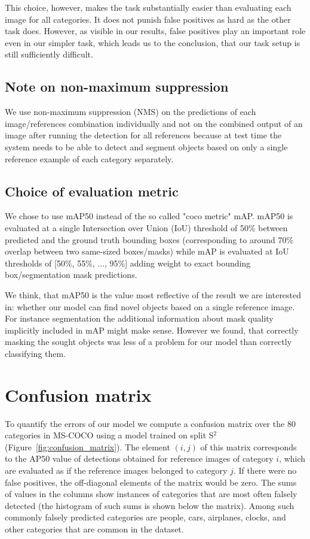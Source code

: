 \documentclass{article}
\newcommand{\coco}{MS-COCO\xspace}
\begin{document}
This choice, however, makes the task substantially easier than evaluating each image for all categories. It does not punish false positives as hard as the other task does. However, as visible in our results, false positives play an important role even in our simpler task, which leads us to the conclusion, that our task setup is still sufficiently difficult.

\subsection{Note on non-maximum suppression}
We use non-maximum suppression (NMS) on the predictions of each image/references combination individually and not on the combined output of an image after running the detection for all references because at test time the system needs to be able to detect and segment objects based on only a single reference example of each category separately.

\subsection{Choice of evaluation metric}

We chose to use mAP50 instead of the so called "coco metric" mAP. mAP50 is evaluated at a single Intersection over Union (IoU) threshold of 50\% between predicted and the ground truth bounding boxes (corresponding to around 70\% overlap between two same-sized boxes/masks) while mAP is evaluated at IoU thresholds of [50\%, 55\%, ..., 95\%] adding weight to exact bounding box/segmentation mask predictions.

We think, that mAP50 is the value most reflective of the result we are interested in: whether our model can find novel objects based on a single reference image. For instance segmentation the additional information about mask quality implicitly included in mAP might make sense. However we found, that correctly masking the sought objects was less of a problem for our model than correctly classifying them.

\section{Confusion matrix}
\label{appendix:confusion_matrix}

To quantify the errors of our model we compute a confusion matrix over the 80 categories in \coco using a model trained on split S$^2$ (Figure~\ref{fig:confusion_matrix}). The element $(i,j)$ of this matrix corresponds to the AP50 value of detections obtained for reference images of category $i$, which are evaluated as if the reference images belonged to category $j$. If there were no false positives, the off-diagonal elements of the matrix would be zero. The sums of values in the columns show instances of categories that are most often falsely detected (the histogram of such sums is shown below the matrix). Among such commonly falsely predicted categories are people, cars, airplanes, clocks, and other categories that are common in the dataset.
\end{document}
